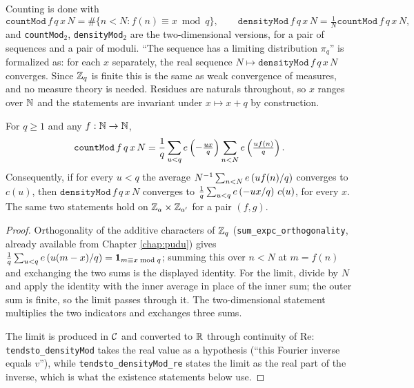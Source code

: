 Counting is done with
\[
  \texttt{countMod}\,f\,q\,x\,N = \#\{n < N : f(n) \equiv x \bmod q\},
  \qquad
  \texttt{densityMod}\,f\,q\,x\,N = \tfrac1N \texttt{countMod}\,f\,q\,x\,N ,
\]
and \texttt{countMod}$_2$, \texttt{densityMod}$_2$ are the two-dimensional
versions, for a pair of sequences and a pair of moduli. ``The sequence has a
limiting distribution $\pi_q$'' is formalized as: for each $x$ separately, the
real sequence $N \mapsto \texttt{densityMod}\,f\,q\,x\,N$ converges. Since
$\mathbb{Z}_q$ is finite this is the same as weak convergence of measures, and no
measure theory is needed. Residues are naturals throughout, so $x$ ranges over
$\mathbb{N}$ and the statements are invariant under $x \mapsto x + q$ by construction.

\begin{lemma}
  \label{lem:fourierMod}
  \leanok
  For $q \geq 1$ and any $f : \mathbb{N} \to \mathbb{N}$,
  \[
    \texttt{countMod}\,f\,q\,x\,N
      = \frac1q \sum_{u < q} e\left(-\tfrac{ux}{q}\right) \sum_{n<N} e\left(\tfrac{u f(n)}{q}\right) .
  \]
  Consequently, if for every $u < q$ the average
  $N^{-1}\sum_{n<N} e\left(u f(n)/q\right)$ converges to $c(u)$, then
  $\texttt{densityMod}\,f\,q\,x\,N$ converges to
  $\frac1q\sum_{u<q} e\left(-ux/q\right)\,c(u)$, for every $x$. The same two statements
  hold on $\mathbb{Z}_a \times \mathbb{Z}_{a'}$ for a pair $(f,g)$.
\end{lemma}
\begin{proof}
  \leanok
  Orthogonality of the additive characters of $\mathbb{Z}_q$
  (\texttt{sum\_expc\_orthogonality}, already available from Chapter
  \ref{chap:pudu}) gives
  $\frac1q\sum_{u<q}e\left(u(m-x)/q\right) = \mathbf 1_{m \equiv x \bmod q}$; summing
  this over $n < N$ at $m = f(n)$ and exchanging the two sums is the displayed
  identity. For the limit, divide by $N$ and apply the identity with the inner
  average in place of the inner sum; the outer sum is finite, so the limit
  passes through it. The two-dimensional statement multiplies the two
  indicators and exchanges three sums.

  The limit is produced in $\mathcal{C}$ and converted to $\mathbb{R}$ through continuity of
  $\mathrm{Re}$: \texttt{tendsto\_densityMod} takes the real value as a
  hypothesis (``this Fourier inverse equals $v$''), while
  \texttt{tendsto\_densityMod\_re} states the limit as the real part of the
  inverse, which is what the existence statements below use.
\end{proof}

